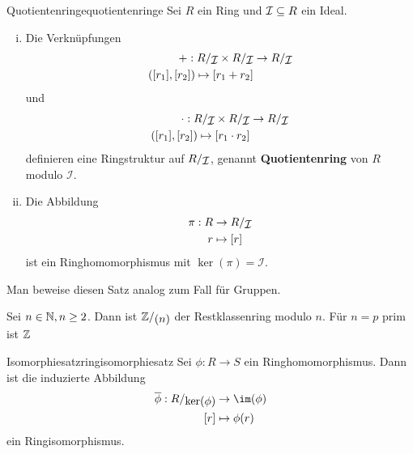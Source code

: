 \begin{satz}{Quotientenringe}{quotientenringe}
Sei $R$ ein Ring und $\mathcal{I} \subseteq R$ ein Ideal.
\begin{enumerate}[(i)]
\item Die Verknüpfungen 
\begin{equation}
\begin{split}
+: \quotient{R}{\mathcal{I}} \times \quotient{R}{\mathcal{I}} &\to \quotient{R}{\mathcal{I}}\\
([r_1], [r_2]) \mapsto [r_1 + r_2]
\end{split}
\end{equation}
und
\begin{equation}
\begin{split}
\cdot: \quotient{R}{\mathcal{I}} \times \quotient{R}{\mathcal{I}} &\to \quotient{R}{\mathcal{I}}\\
([r_1], [r_2]) \mapsto [r_1 \cdot r_2]
\end{split}
\end{equation}
definieren eine Ringstruktur auf $\quotient{R}{\mathcal{I}}$, genannt \textbf{Quotientenring} von $R$ modulo $\mathcal{I}$.
\item Die Abbildung 
\begin{equation}
\begin{split}
\pi: R &\to \quotient{R}{\mathcal{I}}\\
r &\mapsto [r]
\end{split}
\end{equation}
ist ein Ringhomomorphismus mit $\ker (\pi) = \mathcal{I}$.
\end{enumerate}
\end{satz}
\begin{übung}
Man beweise diesen Satz analog zum Fall für Gruppen.
\end{übung}
\begin{beispiel}
Sei $n \in \mathbb{N}, n \geq 2$. Dann ist $\quotient{\Z}{(n)}$ der Restklassenring modulo $n$. Für $n=p$ prim ist $\mathbb{Z}$
\end{beispiel}
\begin{theorem}{Isomorphiesatz}{ringisomorphiesatz}
Sei $\phi: R \to S$ ein Ringhomomorphismus. Dann ist die induzierte Abbildung
\begin{equation}
\begin{split}
\overline{\phi}: \quotient{R}{\ker (\phi)} &\to \im (\phi)\\
[r] &\mapsto \phi(r)
\end{split}
\end{equation}
ein Ringisomorphismus.
\end{theorem}
